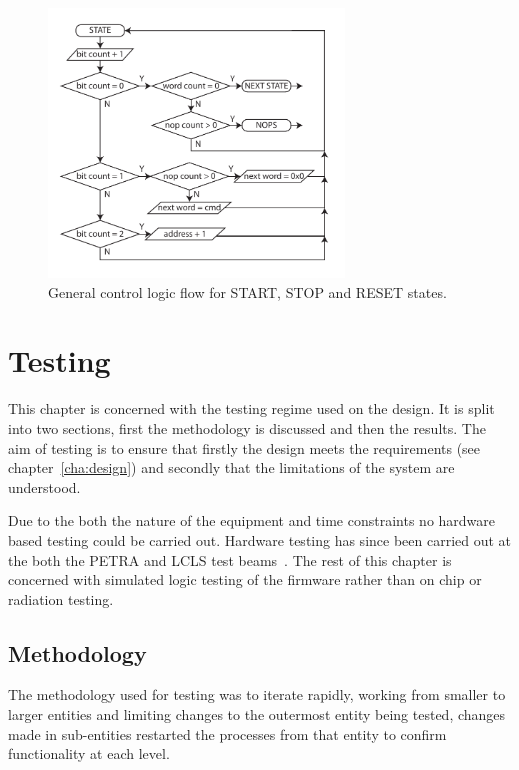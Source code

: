 \begin{figure}[htbp]
  \centering
  \includegraphics[width=0.7\textwidth]{images/pdfs/tx_sm_bram_control_flow.pdf}
  \caption{General control logic flow for START, STOP and RESET states.}
  \label{fig:tx_sm_bram_control_flow}
\end{figure}

\chapter{Testing} %
\label{cha:testing}
This chapter is concerned with the testing regime used on the design. It is split into two sections, first the methodology is discussed and then the results. The aim of testing is to ensure that firstly the design meets the requirements (see chapter~\ref{cha:design}) and secondly that the limitations of the system are understood.

Due to the both the nature of the equipment and time constraints no hardware based testing could be carried out. Hardware testing has since been carried out at the both the PETRA and LCLS test beams~\cite{lpd_at_lcls}. The rest of this chapter is concerned with simulated logic testing of the firmware rather than on chip or radiation testing.

\section{Methodology} %
\label{sec:methodology}
The methodology used for testing was to iterate rapidly, working from smaller to larger entities and limiting changes to the outermost entity being tested, changes made in sub-entities restarted the processes from that entity to confirm functionality at each level. 

